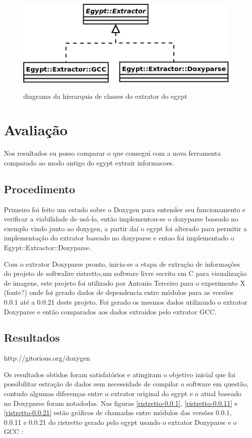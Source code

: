 \begin{figure}[h]
\center
\includegraphics[scale=0.5]{imagens/egypt-diagram-extractor}
\label{egypt-diagram-extractor}
\caption{diagrama da hierarquia de classes do extrator do egypt}
\end{figure}

\chapter{Avaliação}

Nos resultados eu posso comparar o que consegui com a nova ferramenta comparado ao modo antigo do egypt extrair informacoes.

\section{Procedimento}

Primeiro foi feito um estudo sobre o Doxygen para entender seu funcionamento e
verificar a viabilidade de usá-lo, então implementou-se o doxyparse baseado no
exemplo vindo junto ao doxygen, a partir daí o egypt foi alterado para permitir
a implementação do extrator baseado no doxyparse e entao foi implementado o
Egypt::Extractor::Doxyparse.

Com o extrator Doxyparse pronto, inicia-se a etapa de extração de informações do projeto de softwalire ristretto,um software livre escrito em C para visualização de imagens, este projeto foi utilizado por Antonio Terceiro para o experimento X (fonte?) onde foi gerado dados de dependencia entre módulos para as versões 0.0.1 até a 0.0.21 deste projeto. Foi gerado os mesmos dados utilizando o extrator Doxyparse e então comparados aos dados extraidos pelo extrator GCC.

\section{Resultados}

http://gitorious.org/doxygen

Os resultados obtidos foram satisfatórios e atingiram o objetivo inicial que foi possibilitar estração de dados sem necessidade de compilar o software em questão, contudo algumas diferenças entre o extrator original do egypt e o atual baseado no Doxyparse foram notadodas. Nas figuras \ref{ristretto-0.0.1}, \ref{ristretto-0.0.11} e \ref{ristretto-0.0.21} estão gráficos de chamadas entre módulos das versões 0.0.1, 0.0.11 e 0.0.21 do ristretto gerado pelo egypt usando o extrator Doxyparse e o GCC :

